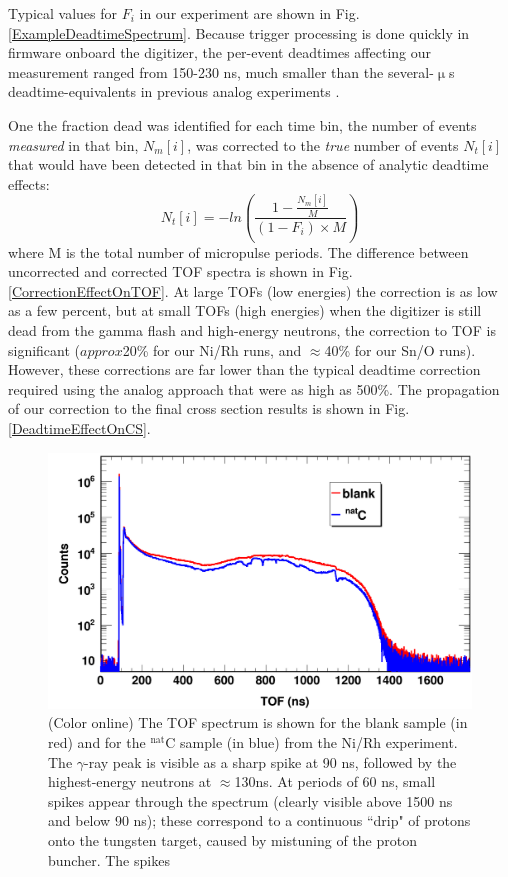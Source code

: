 \documentclass[twocolumn,secnumarabic,amssymb, nobibnotes, aps, prl,
superscriptaddress, nobalancelastpage]{revtex4}
\begin{document}
Typical values for $F_{i}$ in our experiment are shown in Fig.
\ref{ExampleDeadtimeSpectrum}. Because trigger processing is done quickly in
firmware onboard the digitizer, the per-event deadtimes affecting our
measurement ranged from 150-230 ns, much smaller than the several-$\upmu$s
deadtime-equivalents in previous analog experiments \cite{Finlay1993,
Abfalterer2001}.

One the fraction dead was identified for each time bin, the number of events
\textit{measured} in that bin, $N_{m}[i]$, was corrected to the \textit{true}
number of events $N_{t}[i]$ that would have been detected in that bin in the absence of
analytic deadtime effects:
\begin{equation}
    N_{t}[i] = -ln\left(\frac{1-\frac{N_m[i]}{M}}{(1-F_{i})\times M}\right)
\end{equation}
where M is the total number of micropulse periods. The difference between
uncorrected and corrected TOF spectra is shown in Fig.
\ref{CorrectionEffectOnTOF}. At large TOFs (low energies) the correction is as low as a
few percent, but at small TOFs (high energies) when the digitizer is still dead
from the gamma flash and high-energy neutrons, the correction to TOF is significant
($approx$20\% for our Ni/Rh runs, and $\approx$40\% for our Sn/O runs). However, these corrections are far lower than the typical
deadtime correction required using the analog approach \cite{Finlay1993,
Abfalterer2001} that were as high as 500\%. The propagation of our correction to the final 
cross section results is shown in Fig. \ref{DeadtimeEffectOnCS}.

\begin{figure}
    \includegraphics[scale=0.3]{figures/exampleTOFSpectrum.png}
    \caption{(Color online) The TOF spectrum is shown for the blank sample (in
        red) and for the $^{\text{nat}}$C sample (in blue) from the Ni/Rh experiment.
        The $\gamma$-ray peak is visible as a sharp spike at 90 ns, followed by
        the highest-energy neutrons at $\approx$130ns. At periods of 60 ns,
        small spikes appear through the spectrum (clearly visible above 1500 ns
        and below 90 ns); these correspond to a continuous ``drip" of protons
        onto the tungsten target, caused by mistuning of the proton buncher. The
        spikes
    }
    \label{ExampleTOFSpectrum}
\end{figure}
\end{document}
